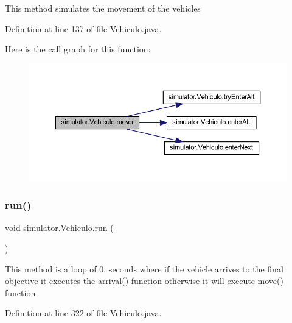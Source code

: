 This method simulates the movement of the vehicles 

Definition at line 137 of file Vehiculo.\+java.

Here is the call graph for this function\+:\nopagebreak
\begin{figure}[H]
\begin{center}
\leavevmode
\includegraphics[width=350pt]{classsimulator_1_1_vehiculo_a6180368ea8c35b2e7113a5f2b1368f92_cgraph}
\end{center}
\end{figure}
\mbox{\label{classsimulator_1_1_vehiculo_a4cbe0a3d742c02919a0c355f42f3e35d}} 
\subsubsection{\texorpdfstring{run()}{run()}}
{\footnotesize\ttfamily void simulator.\+Vehiculo.\+run (\begin{DoxyParamCaption}{ }\end{DoxyParamCaption})}

This method is a loop of 0. seconds where if the vehicle arrives to the final objective it executes the arrival() function otherwise it will execute move() function 

Definition at line 322 of file Vehiculo.\+java.

